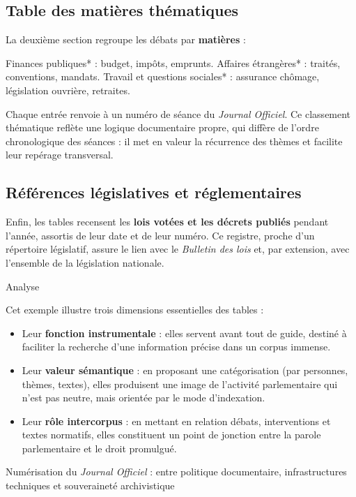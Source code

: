 \subsection{Table des matières thématiques}

La deuxième section regroupe les débats par \textbf{matières} :

\emph{ }Finances publiques* : budget, impôts, emprunts.
\emph{ }Affaires étrangères* : traités, conventions, mandats.
\emph{ }Travail et questions sociales* : assurance chômage, législation ouvrière, retraites.

Chaque entrée renvoie à un numéro de séance du \emph{Journal Officiel}. Ce classement thématique reflète une logique documentaire propre, qui diffère de l’ordre chronologique des séances : il met en valeur la récurrence des thèmes et facilite leur repérage transversal.

\subsection{Références législatives et réglementaires}

Enfin, les tables recensent les \textbf{lois votées et les décrets publiés} pendant l’année, assortis de leur date et de leur numéro. Ce registre, proche d’un répertoire législatif, assure le lien avec le \emph{Bulletin des lois} et, par extension, avec l’ensemble de la législation nationale.









 Analyse

Cet exemple illustre trois dimensions essentielles des tables :

\begin{itemize}
\item Leur \textbf{fonction instrumentale} : elles servent avant tout de guide, destiné à faciliter la recherche d’une information précise dans un corpus immense.
\item Leur \textbf{valeur sémantique} : en proposant une catégorisation (par personnes, thèmes, textes), elles produisent une image de l’activité parlementaire qui n’est pas neutre, mais orientée par le mode d’indexation.
\item Leur \textbf{rôle intercorpus} : en mettant en relation débats, interventions et textes normatifs, elles constituent un point de jonction entre la parole parlementaire et le droit promulgué.







\end{itemize}
 Numérisation du \emph{Journal Officiel} : entre politique documentaire, infrastructures techniques et souveraineté archivistique

